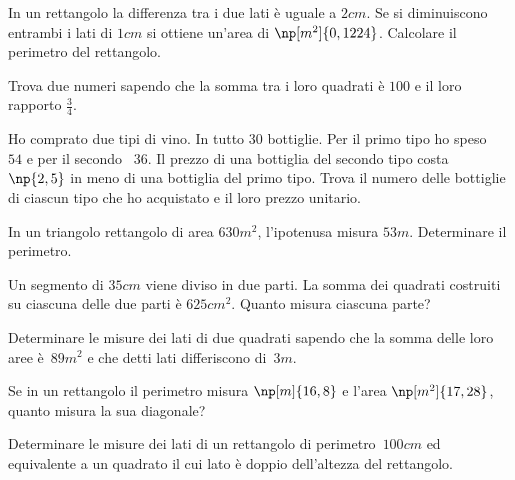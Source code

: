 \begin{multicols}{2}
\begin{esercizio}[\Ast]
 \label{ese:6.78}
In un rettangolo la differenza tra i due lati è uguale a $2\unit{cm}$. Se si diminuiscono entrambi i lati di $ 1\unit{cm} $ si ottiene un'area di $\np[m^2]{0,1224}$. Calcolare il perimetro del rettangolo.
\end{esercizio}

\begin{esercizio}[\Ast]
 \label{ese:6.79}
Trova due numeri sapendo che la somma tra i loro quadrati è $ 100 $ e il loro rapporto $ \frac 3 4 $.
\end{esercizio}

\begin{esercizio}[\Ast]
 \label{ese:6.80}
Ho comprato due tipi di vino. In tutto 30 bottiglie. Per il primo tipo ho speso \officialeuro~$54$ e per il secondo \officialeuro~$36$. Il prezzo di una bottiglia del secondo tipo costa \officialeuro~$\np{2,5}$ in meno di una bottiglia del primo tipo. Trova il numero delle bottiglie di ciascun tipo che ho acquistato e il loro prezzo unitario.
\end{esercizio}

\begin{esercizio}[\Ast]
 \label{ese:6.81}
In un triangolo rettangolo di area $630\unit{m^2}$, l'ipotenusa misura $53\unit{m}$. Determinare il perimetro.
\end{esercizio}

\begin{esercizio}[\Ast]
 \label{ese:6.82}
Un segmento di $35\unit{cm}$ viene diviso in due parti. La somma dei quadrati costruiti su ciascuna delle due parti è $625\unit{{cm}^2}$. Quanto misura ciascuna parte?
\end{esercizio}

\begin{esercizio}[\Ast]
 \label{ese:6.83}
Determinare le misure dei lati di due quadrati sapendo che la somma delle loro aree è~$89 \unit{m^{2}}$ e che detti lati differiscono di~$3 \unit{m}$.
\end{esercizio}

\begin{esercizio}[\Ast]
 \label{ese:6.84}
Se in un rettangolo il perimetro misura $\np[m]{16,8}$ e l'area $ \np[m^2]{17,28}$, quanto misura la sua diagonale?
\end{esercizio}

\begin{esercizio}[\Ast]
 \label{ese:6.85}
Determinare le misure dei lati di un rettangolo di perimetro~$100 \unit{cm}$ ed equivalente a un quadrato il cui lato è doppio  dell'altezza del rettangolo.
\end{esercizio}


\end{multicols}
